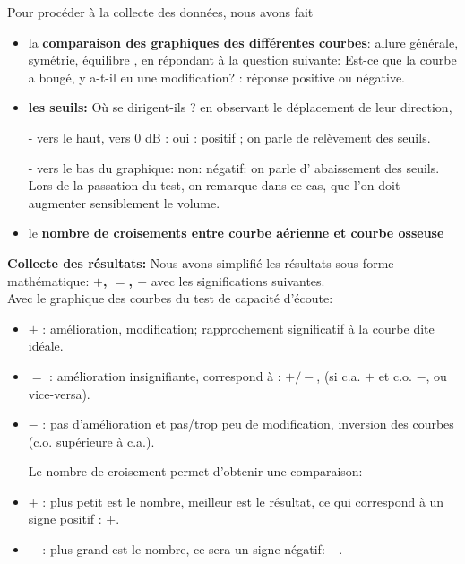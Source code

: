 Pour procéder à la collecte des données, nous avons fait 
 \begin{itemize}		
		\item la \textbf{comparaison des graphiques des différentes courbes}: allure générale, symétrie, 
		équilibre , en répondant à la question suivante:  
		Est-ce que la courbe a bougé, y a-t-il eu une modification? : réponse  positive ou négative.
			\item \textbf{les seuils: }
	Où se dirigent-ils ? 
	en observant le déplacement de leur direction,
	
	-   vers le haut, vers 0 dB : oui : positif ; on parle de relèvement des seuils.
	
	
	-   vers le bas du graphique: non: négatif: on parle d' abaissement des seuils.
	Lors de la passation du test, on remarque dans ce cas, que l'on doit augmenter sensiblement le 
	volume.
	\item le \textbf{nombre de croisements entre courbe aérienne et courbe osseuse}
\end{itemize}
 \textbf{Collecte des résultats: } 
Nous avons simplifié les résultats sous forme 
mathématique:  \textbf{ $+$, $=$, $-$ } avec les significations suivantes.
\\
Avec  le graphique des courbes du test de capacité d'écoute: 
\begin{itemize}
	\item$+$   : amélioration, modification;  rapprochement significatif à la courbe dite idéale.
	\item$=$   : amélioration insignifiante, correspond à : $+/-$, (si c.a. $ + $ et c.o. $-$, ou vice-versa).
	\item$-$   : pas d'amélioration et pas/trop peu  de modification, inversion
	des courbes (c.o. supérieure à c.a.).
	
Le nombre de croisement permet  d'obtenir une comparaison:
	\item $+$ : plus petit est le nombre, meilleur est le résultat, ce qui correspond à un signe positif : $+$.
	\item$-$   : plus grand est le nombre, ce sera un signe négatif: $-$.
\end{itemize}

